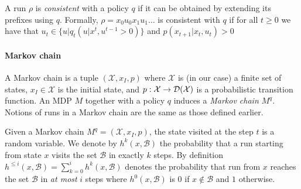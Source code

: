A run $\rho$ is \emph{consistent} with a policy $q$ if it can be
obtained by extending its prefixes using $q$. Formally, $\rho=x_0
u_0 x_1 u_1 \dots$ is consistent with $q$ if for all $t \ge 0$ we have that
$u_t \in \{u| q_t(u|x^t,u^{t-1} > 0)\}$ and $p(x_{t+1}|x_t,u_t)>0$

\paragraph*{Markov chain}
A Markov chain is a tuple $(\mathcal{X},x_I,p)$ where $\mathcal{X}$ is (in our case) a finite set of states, $x_I \in \mathcal{X}$ is the initial state, and $p: \mathcal{X} \to \mathcal{D}(\mathcal{X})$ is a probabilistic transition function. An MDP $M$ together with a policy $q$ induces a \emph{Markov chain} $M^q$.  Notions of runs in a Markov chain are the same as those defined earlier. 

Given a Markov chain $M^q = (\mathcal{X},x_I,p)$, the state visited at the step $t$ is
a random variable. We denote by $h^{k}(x,\mathcal{B})$ the probability that a
run starting from state $x$ visits the set $\mathcal{B}$ in exactly $k$ steps. By definition
$h^{\leq i}(x,\mathcal{B}) = \sum_{k=0}^{i} h^{k}(x,\mathcal{B})$ denotes the probability that run from $x$ reaches the set $\mathcal{B}$ in \emph{at most} $i$ steps where $h^0(x,\mathcal{B})$ is $0$ if $x
\not\in \mathcal{B}$ and $1$ otherwise.




